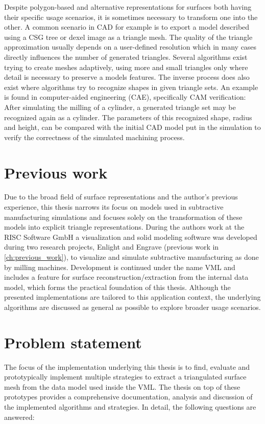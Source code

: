 Despite polygon-based and alternative representations for surfaces both having their specific usage scenarios, it is sometimes necessary to transform one into the other.
A common scenario in CAD for example is to export a model described using a CSG tree or dexel image as a triangle mesh.
The quality of the triangle approximation usually depends on a user-defined resolution which in many cases directly influences the number of generated triangles.
Several algorithms exist trying to create meshes adaptively, using more and small triangles only where detail is necessary to preserve a models features.
%
The inverse process does also exist where algorithms try to recognize shapes in given triangle sets.
An example is found in computer-aided engineering (CAE), specifically CAM verification: After simulating the milling of a cylinder, a generated triangle set may be recognized again as a cylinder. The parameters of this recognized shape, \eg radius and height, can be compared with the initial CAD model put in the simulation to verify the correctness of the simulated machining process.


\section{Previous work}

Due to the broad field of surface representations and the author's previous experience, this thesis narrows its focus on models used in subtractive manufacturing simulations and focuses solely on the transformation of these models into explicit triangle representations.
During the authors work at the RISC Software GmbH a visualization and solid modeling software was developed during two research projects, Enlight and Engrave (\cf previous work in \cref{ch:previous_work}), to visualize and simulate subtractive manufacturing as done by milling machines.
Development is continued under the name VML and includes a feature for surface reconstruction/extraction from the internal data model, which forms the practical foundation of this thesis.
Although the presented implementations are tailored to this application context, the underlying algorithms are discussed as general as possible to explore broader usage scenarios.


\section{Problem statement}
\label{sec:problem}

The focus of the implementation underlying this thesis is to find, evaluate and prototypically implement multiple strategies to extract a triangulated surface mesh from the data model used inside the VML.
The thesis on top of these prototypes provides a comprehensive documentation, analysis and discussion of the implemented algorithms and strategies.
In detail, the following questions are answered:

